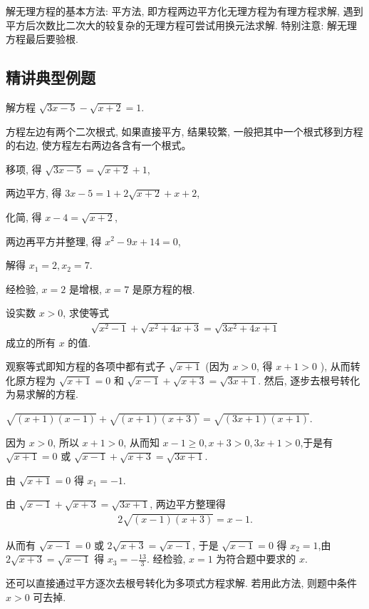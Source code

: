 解无理方程的基本方法: 平方法, 即方程两边平方化无理方程为有理方程求解, 遇到平方后次数比二次大的较复杂的无理方程可尝试用换元法求解.
特别注意: 解无理方程最后要验根.

\subsection{精讲典型例题}
\begin{example}
	解方程 $\sqrt{3 x-5}-\sqrt{x+2}=1$.
\end{example}
\begin{analysis}
	方程左边有两个二次根式, 如果直接平方, 结果较繁, 一般把其中一个根式移到方程的右边, 使方程左右两边各含有一个根式。
\end{analysis}
\begin{solution}
	移项, 得 $\sqrt{3 x-5}=\sqrt{x+2}+1$,

	两边平方, 得 $3 x-5=1+2 \sqrt{x+2}+x+2$,

	化简, 得 $x-4=\sqrt{x+2}$,

	两边再平方并整理, 得 $x^2-9 x+14=0$,

	解得 $x_1=2, x_2=7$.

	经检验, $x=2$ 是增根, $x=7$ 是原方程的根.
\end{solution}

\begin{example}
	设实数 $x>0$, 求使等式
	\begin{align*}
		\sqrt{x^2-1}+\sqrt{x^2+4 x+3}=\sqrt{3 x^2+4 x+1}
	\end{align*}
	成立的所有 $x$ 的值\cite{葛军2012数学奥林匹克小丛书}.
\end{example}
\begin{analysis}
	观察等式即知方程的各项中都有式子 $\sqrt{x+1}$ (因为 $x>0$, 得 $x+1>0$ ), 从而转化原方程为 $\sqrt{x+1}=0$ 和 $\sqrt{x-1}+\sqrt{x+3}=\sqrt{3 x+1}$. 然后, 逐步去根号转化为易求解的方程.
\end{analysis}
\begin{solution}
	$\sqrt{(x+1)(x-1)}+\sqrt{(x+1)(x+3)}=\sqrt{(3 x+1)(x+1)}$.
	
	因为 $x>0$, 所以 $x+1>0$, 从而知 $x-1 \geqslant 0, x+3>0,3 x+1>0$,于是有 $\sqrt{x+1}=0$ 或 $\sqrt{x-1}+\sqrt{x+3}=\sqrt{3 x+1}$.
	
	由 $\sqrt{x+1}=0$ 得 $x_1=-1$.
	
	由 $\sqrt{x-1}+\sqrt{x+3}=\sqrt{3 x+1}$, 两边平方整理得
	\begin{align*}
		2 \sqrt{(x-1)(x+3)}=x-1 .
	\end{align*}

	从而有 $\sqrt{x-1}=0$ 或 $2 \sqrt{x+3}=\sqrt{x-1}$, 于是 $\sqrt{x-1}=0$ 得 $x_2=1$,由 $2 \sqrt{x+3}=\sqrt{x-1}$ 得 $x_3=-\frac{13}{3}$.
	经检验, $x=1$ 为符合题中要求的 $x$.
\end{solution}
\begin{note}
	还可以直接通过平方逐次去根号转化为多项式方程求解. 若用此方法, 则题中条件 $x>0$ 可去掉.
\end{note}

